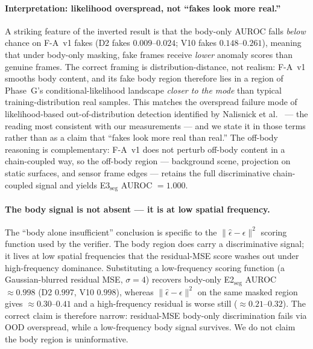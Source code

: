 \paragraph{Interpretation: likelihood overspread, not ``fakes look more real.''}
A striking feature of the inverted result is that the body-only AUROC falls \emph{below} chance on F-A~v1 fakes (D2 fakes $0.009$--$0.024$; V10 fakes $0.148$--$0.261$), meaning that under body-only masking, fake frames receive \emph{lower} anomaly scores than genuine frames. The correct framing is distribution-distance, not realism: F-A~v1 smooths body content, and its fake body region therefore lies in a region of Phase~G's conditional-likelihood landscape \emph{closer to the mode} than typical training-distribution real samples. This matches the overspread failure mode of likelihood-based out-of-distribution detection identified by Nalisnick et al.\ \cite{nalisnick2019} --- the reading most consistent with our measurements --- and we state it in those terms rather than as a claim that ``fakes look more real than real.'' The off-body reasoning is complementary: F-A~v1 does not perturb off-body content in a chain-coupled way, so the off-body region --- background scene, projection on static surfaces, and sensor frame edges --- retains the full discriminative chain-coupled signal and yields E3$_{\mathrm{seg}}$ AUROC $=1.000$.

\paragraph{The body signal is not absent --- it is at low spatial frequency.}
The ``body alone insufficient'' conclusion is specific to the $\lVert \hat{\epsilon}-\epsilon\rVert^2$ scoring function used by the verifier. The body region does carry a discriminative signal; it lives at low spatial frequencies that the residual-MSE score washes out under high-frequency dominance. Substituting a low-frequency scoring function (a Gaussian-blurred residual MSE, $\sigma = 4$) recovers body-only E2$_{\mathrm{seg}}$ AUROC $\approx 0.998$ (D2 $0.997$, V10 $0.998$), whereas $\lVert \hat{\epsilon}-\epsilon\rVert^2$ on the same masked region gives $\approx 0.30$--$0.41$ and a high-frequency residual is worse still ($\approx 0.21$--$0.32$). The correct claim is therefore narrow: residual-MSE body-only discrimination fails via OOD overspread, while a low-frequency body signal survives. We do not claim the body region is uninformative.

